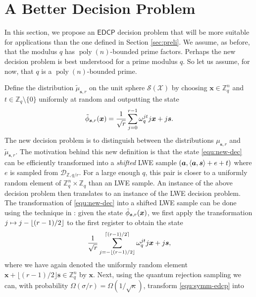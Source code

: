 \documentclass[11pt]{article}
\theoremstyle{plain}
\theoremstyle{definition}
\DeclareMathOperator{\poly}{poly}
\let\ket\relax
\DeclarePairedDelimiter{\ket}{\lvert}{\rangle}
\DeclarePairedDelimiter{\lrang}{\langle}{\rangle}
\def\Z{\mathbb{Z}}
\def\edcp{\mathsf{EDCP}}
\def\SX{\mathcal{S(X)}}
\begin{document}



\section{A Better Decision Problem}

In this section, we propose an $\edcp$ decision problem that will be more suitable for applications than the one defined in Section \ref{sec:preli}. We assume, as before, that the modulus $q$ has $\poly(n)$-bounded prime factors. Perhaps the new decision problem is best understood for a prime modulus $q$. So let us assume, for now, that $q$ is a $\poly(n)$-bounded prime. 

Define the distribution $\tilde{\mu}_{\bm{s}, r}$ on the unit sphere $\SX$ by choosing $\bm{x} \in \Z_q^n$ and $t \in \Z_q {\setminus} \{ 0 \}$ uniformly at random and outputting the state
\begin{equation}
    \label{equ:new-dec}
    \ket{\tilde{\phi}_{\bm{s}, r}(\bm{x})} = \frac{1}{\sqrt{r}} \sum_{j = 0}^{r - 1} \omega_q^{jt} \ket{j}\ket{\bm{x} + j\bm{s}}.
\end{equation}
The new decision problem is to distinguish between the distributions $\mu_{\bm{s}, r}$ and $\tilde{\mu}_{\bm{s}, r}$. The motivation behind this new definition is that the state \eqref{equ:new-dec} can be efficiently transformed into a \textit{shifted} LWE sample $(\bm{a}, \lrang{\bm{a}, \bm{s}} + e + t)$ where $e$ is sampled from $\mathcal{D}_{\Z, q / r}$. For a large enough $q$, this pair is closer to a uniformly random element of $\Z_q^n \times \Z_q$ than an LWE sample. An instance of the above decision problem then translates to an instance of the LWE decision problem. The transformation of \eqref{equ:new-dec} into a shifted LWE sample can be done using the technique in \cite{brakerski2018learning}: given the state $\ket{\tilde{\phi}_{\bm{s}, r}(\bm{x})}$, we first apply the transformation $\ket{j} \mapsto \ket{j - \lfloor (r - 1) / 2 \rfloor}$ to the first register to obtain the state
\begin{equation}
    \label{equ:symm-edcp}
    \frac{1}{\sqrt{r}} \sum_{j = -\lfloor (r - 1) / 2 \rfloor}^{\lceil (r - 1) / 2 \rceil} \omega_q^{jt} \ket{j}\ket{\bm{x} + j\bm{s}},
\end{equation}
where we have again denoted the uniformly random element $\bm{x} + \lfloor (r - 1) / 2 \rfloor \bm{s} \in \Z_q^n$ by $\bm{x}$. Next, using the quantum rejection sampling we can, with probability $\Omega(\sigma / r) = \Omega(1 / \sqrt{\kappa})$, transform \eqref{equ:symm-edcp} into 
\end{document}
